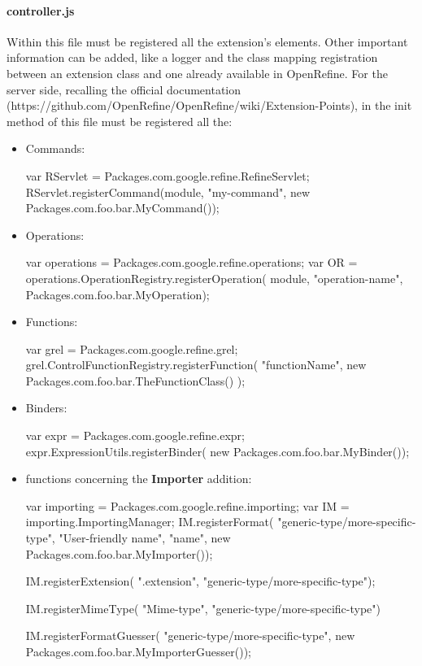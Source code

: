\paragraph{controller.js} Within this file must be registered all the extension's elements. Other important information can be added, like a logger and the class mapping registration between an extension class and one already available in OpenRefine. For the server side, recalling the official documentation (https://github.com/OpenRefine/OpenRefine/wiki/Extension-Points), in the init method of this file must be registered all the:
\begin{itemize}
	\item Commands:
	\begin{code}	
var RServlet = Packages.com.google.refine.RefineServlet;
RServlet.registerCommand(module, "my-command", 
new Packages.com.foo.bar.MyCommand());
    \end{code}
    \item Operations:
    \begin{code}	
var operations = Packages.com.google.refine.operations;
var OR = operations.OperationRegistry.registerOperation(
module, "operation-name", 
Packages.com.foo.bar.MyOperation);
  	\end{code}
  	\item Functions:
  	\begin{code}	
var grel = Packages.com.google.refine.grel;
grel.ControlFunctionRegistry.registerFunction(
   "functionName", 
    new Packages.com.foo.bar.TheFunctionClass()
);
    \end{code}
    \item Binders:
    \begin{code}
var expr = Packages.com.google.refine.expr;
expr.ExpressionUtils.registerBinder(
new Packages.com.foo.bar.MyBinder());
    \end{code}
    \item functions concerning the \textbf{Importer} addition:
    \begin{code}
var importing = Packages.com.google.refine.importing;
var IM = importing.ImportingManager;
IM.registerFormat(
  "generic-type/more-specific-type", 
  "User-friendly name", 
  "name", new Packages.com.foo.bar.MyImporter());

IM.registerExtension(
".extension", "generic-type/more-specific-type");

IM.registerMimeType(
"Mime-type", "generic-type/more-specific-type")

IM.registerFormatGuesser(
   "generic-type/more-specific-type", 
   new Packages.com.foo.bar.MyImporterGuesser());


\end{code}
\end{itemize}
